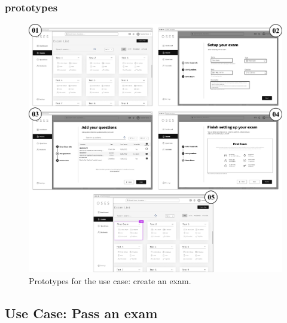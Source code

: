 \documentclass[]{uc2pfecaneva}
\begin{document}
\subsubsection{prototypes}
\begin{figure}[h]
	
	\centering
	\includegraphics[width=\textwidth]{images/prototypes_create_exam}
	
	\caption{Prototypes for the use case: create an exam.}
\end{figure}
\clearpage



\raggedright\subsection{Use Case: Pass an exam}
\end{document}
